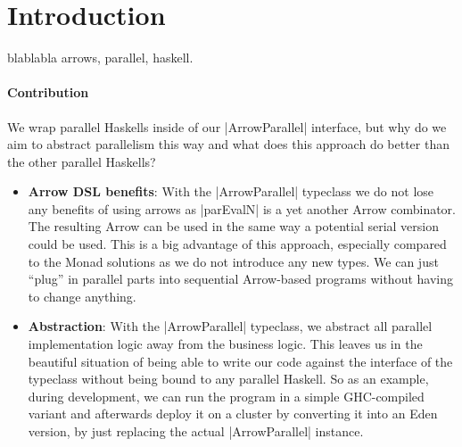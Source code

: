 
\section{Introduction}
\label{sec:introduction}

blablabla arrows, parallel, haskell.

\paragraph{Contribution}


We wrap parallel Haskells inside of our |ArrowParallel| interface, but why do we aim to abstract parallelism this way and what does this approach do better than the other parallel Haskells?
\begin{itemize}
	\item \textbf{Arrow DSL benefits}:
	With the |ArrowParallel| typeclass we do not lose any benefits of using arrows as |parEvalN| is a yet another Arrow combinator. The resulting Arrow can be used in the same way a potential serial version could be used. This is a big advantage of this approach, especially compared to the Monad solutions as we do not introduce any new types. We can just \enquote{plug} in parallel parts into sequential Arrow-based programs without having to change anything.
	\item \textbf{Abstraction}:
	With the |ArrowParallel| typeclass, we abstract all parallel implementation logic away from the business logic. This leaves us in the beautiful situation of being able to write our code against the interface of the typeclass without being bound to any parallel Haskell. So as an example, during development, we can run the program in a simple GHC-compiled variant and afterwards deploy it on a cluster by converting it into an Eden version, by just replacing the actual |ArrowParallel| instance.
\end{itemize}


